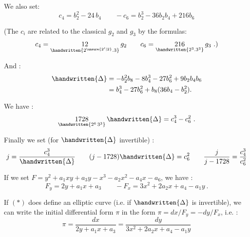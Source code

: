 
We also set:
\[
 c_{4}=b_{2}^{2}-24\,b_{4}\qquad -c_{6}=b_{2}^{3}-36b_{2}b_{4}+216b_{6}
\]

(The $c_{i}$ are related to the classical $g_{2}$ and $g_{3}$ by the formulas:
\[
 c_{4}=\underset{\handwritten{2^{\unsure{2'|2}}\mathord{.}3}}{12}\,g_{2}
 \qquad c_{6}=\underset{\handwritten{2^{3}\mathord{.}3^{3}}}{216}\,g_{3}\ .)
\]

And :
\[
\begin{aligned}
\handwritten{\Delta}&=-b_{2}^{2}b_{8}-8b_{4}^{3}-27b_{6}^{2}+9b_{2}b_{4}b_{6}\\
&=b_{4}^{3}-27b_{6}^{2}+b_{8}(36b_{4}-b_{2}^{2}).
\end{aligned}
\]

We have :
\[
 \underset{\handwritten{2^{6}\,3^{3}}}{1728}\,\handwritten{\Delta}=c_{4}^{3}-c_{6}^{2}\ .
\]

Finally we set (for $\handwritten{\Delta}$ invertible) :
\[
 j=\frac{c_{4}^{3}}{\handwritten{\Delta}}\qquad
 (j-1728)\handwritten{\Delta}=c_{6}^{2}\qquad
 \frac{j}{j-1728}=\frac{c_{4}^{3}}{c_{6}^{2}}
\]

If we set $F=y^{2}+a_{1}xy+a_{3}y-x^{3}-a_{2}x^{2}-a_{4}x-a_{6}$, we have :
\[
 F_{y}=2y+a_{1}x+a_{3}\qquad -F_{x}=3x^{2}+2a_{2}x+a_{4}-a_{1}y\ .
\]

If $(\ast)$ does define an elliptic curve (i.e. if $\handwritten{\Delta}$ is invertible), we can write the initial differential form $\pi$ in the form $\pi=dx/F_{y}=-dy/F_{x}$, i.e. :
\[
 \pi=\frac{dx}{2y+a_{1}x+a_{3}}=\frac{dy}{3x^{2}+2a_{2}x+a_{4}-a_{1}y}
\]
